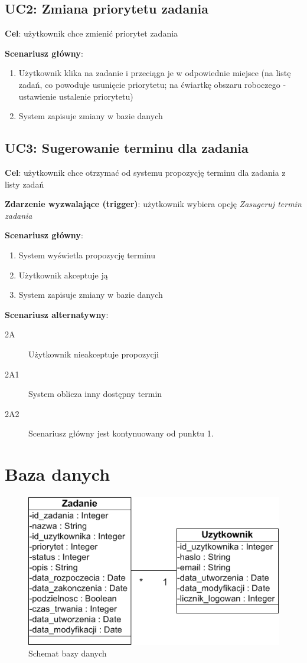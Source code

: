 \documentclass[pdflatex,11pt]{aghdpl}
\begin{document}
\subsection{UC2: Zmiana priorytetu zadania}

\textbf{Cel}: użytkownik chce zmienić priorytet zadania

\textbf{Scenariusz główny}:
\begin{enumerate}
\item Użytkownik klika na zadanie i przeciąga je w odpowiednie miejsce (na listę zadań, co powoduje usunięcie priorytetu; na ćwiartkę obszaru roboczego - ustawienie ustalenie priorytetu)
\item System zapisuje zmiany w bazie danych
\end{enumerate}


\subsection{UC3: Sugerowanie terminu dla zadania}

\textbf{Cel}: użytkownik chce otrzymać od systemu propozycję terminu dla zadania z listy zadań

\textbf{Zdarzenie wyzwalające (trigger)}: użytkownik wybiera opcję \textit{Zasugeruj termin zadania}

\textbf{Scenariusz główny}:
\begin{enumerate}
\item System wyświetla propozycję terminu
\item Użytkownik akceptuje ją
\item System zapisuje zmiany w bazie danych
\end{enumerate}

\textbf{Scenariusz alternatywny}:
\begin{description}
\item[2A] Użytkownik nieakceptuje propozycji
\item[2A1] System oblicza inny dostępny termin
\item[2A2] Scenariusz główny jest kontynuowany od punktu 1.
\end{description}

\clearpage

\section{Baza danych}

\begin{figure}[!h]
\centering
\includegraphics[width=.75\textwidth]{bazyDanych}
\caption{Schemat bazy danych}
\label{fig:bazaDanych}
\end{figure}
\end{document}
